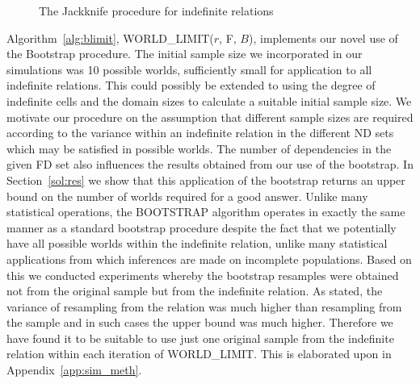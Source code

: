 {\line
\begin{figure}[ht]
\begin{center}
\caption{\label{cp:fig:jackknife} The Jackknife procedure for
indefinite relations}
\end{center}
\end{figure}
}


\medskip
{}
Algorithm~\ref{alg:blimit}, WORLD\_LIMIT($r$, F, $B$), implements our
novel use of the Bootstrap procedure. The initial sample size we
incorporated in our simulations was 10 possible worlds, sufficiently
small for application to all indefinite relations. This could possibly
be extended to using the degree of indefinite cells and the domain sizes
to calculate a suitable initial sample size.
We motivate our procedure on the assumption that different sample sizes are
required according to the variance within an indefinite relation in
the different ND sets which may be satisfied in possible
worlds. The number of dependencies in the given FD set also influences
the results obtained from our use of the bootstrap. In Section~\ref{sol:res}
we show that this application of the bootstrap returns an upper bound on 
the number of worlds required for a good answer. Unlike many statistical
operations, the BOOTSTRAP
algorithm operates in exactly the same manner as a standard bootstrap
procedure despite the fact that we potentially have all possible worlds
within the indefinite relation, unlike many statistical applications
from which inferences are made on incomplete populations.  Based on
this we conducted experiments 
whereby the bootstrap resamples were obtained not from the original
sample but from the indefinite relation. As stated, the variance of resampling
from the relation
was much higher than resampling from the sample and in such cases the
upper bound was much higher. 
Therefore we have found it to be suitable to use just one original sample
from the indefinite relation within each iteration of
WORLD\_LIMIT. This is elaborated upon in Appendix~\ref{app:sim_meth}.


